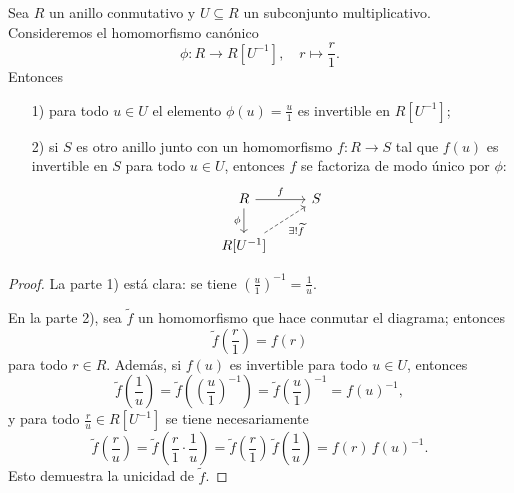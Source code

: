 \begin{proposicion}
  Sea $R$ un anillo conmutativo y $U \subseteq R$ un subconjunto
  multiplicativo. Consideremos el homomorfismo canónico
  $$\phi\colon R \to R [U^{-1}], \quad r \mapsto \frac{r}{1}.$$
  Entonces

  \begin{enumerate}
  \item[1)] para todo $u \in U$ el elemento $\phi (u) = \frac{u}{1}$ es
    invertible en $R [U^{-1}]$;

  \item[2)] si $S$ es otro anillo junto con un homomorfismo $f\colon R \to S$
    tal que $f (u)$ es invertible en $S$ para todo $u\in U$, entonces $f$ se
    factoriza de modo único por $\phi$:
    \[ \begin{tikzcd}
        R\ar{r}{f}\ar{d}[swap]{\phi} & S \\
        R [U^{-1}]\ar[dashed]{ur}[swap]{\exists ! \widetilde{f}}
      \end{tikzcd} \]
  \end{enumerate}

  \begin{proof}
    La parte 1) está clara: se tiene
    $\left(\frac{u}{1}\right)^{-1} = \frac{1}{u}$.

    En la parte 2), sea $\widetilde{f}$ un homomorfismo que hace conmutar
    el diagrama; entonces
    $$\widetilde{f} \left(\frac{r}{1}\right) = f (r)$$
    para todo $r\in R$. Además, si $f (u)$ es invertible para todo $u\in U$,
    entonces
    \[ \widetilde{f} \left(\frac{1}{u}\right) =
       \widetilde{f} \left(\left(\frac{u}{1}\right)^{-1}\right) =
       \widetilde{f} \left(\frac{u}{1}\right)^{-1} =
       f (u)^{-1}, \]
    y para todo $\frac{r}{u} \in R [U^{-1}]$ se tiene necesariamente
    \[ \widetilde{f} \left(\frac{r}{u}\right) =
       \widetilde{f} \left(\frac{r}{1}\cdot \frac{1}{u}\right) =
       \widetilde{f} \left(\frac{r}{1}\right)\,\widetilde{f}
       \left(\frac{1}{u}\right) =
       f (r)\,f (u)^{-1}. \]
    Esto demuestra la unicidad de $\widetilde{f}$.


\end{proof}
\end{proposicion}
